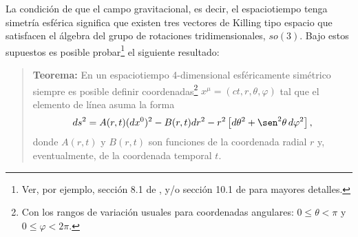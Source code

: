 La condición de que el campo gravitacional, es decir, el espaciotiempo tenga
simetría esférica significa que existen tres vectores de Killing tipo espacio que satisfacen el álgebra del grupo de rotaciones tridimensionales, $so(3)$. Bajo estos supuestos es posible probar\footnote{Ver, por ejemplo, sección 8.1 de \cite{Wei72}, y/o sección 10.1 de \cite{FC} para mayores detalles.} el siguiente resultado:

\begin{quotation}
{\bf Teorema:} En un espaciotiempo 4-dimensional esféricamente simétrico
siempre es posible definir coordenadas\footnote{Con los rangos de variación usuales para coordenadas angulares: $0\le\theta<\pi$ y $0\le\varphi <2\pi$.} $x^\mu=(ct,r,\theta,\varphi)$ tal
que el elemento de línea asuma la forma
\begin{equation}\label{dsoriginal}
ds^2=A(r,t)(dx^0)^2-B(r,t)dr^2-r^2\left[ d\theta^2+\sen^2\theta
\,d\varphi^2\right],
\end{equation}
donde $A(r,t)$ y $B(r,t)$ son funciones de la coordenada radial $r$ y,
eventualmente, de la coordenada temporal $t$.
\end{quotation}

